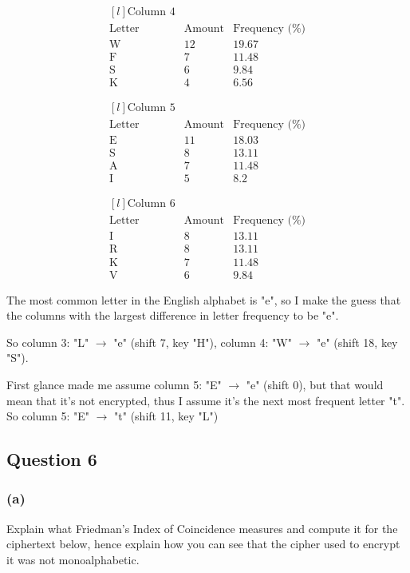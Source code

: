 \documentclass{article}
\begin{document}
	\[
	\begin{matrix*}[l]
	\text{Column 4} \\
	\text{Letter} & \text{Amount} & \text{Frequency (\%)} \\
	\text{W} & 12&19.67 \\
	\text{F} & 7&11.48 \\
	\text{S} & 6&9.84 \\
	\text{K} & 4&6.56
	\end{matrix*}
	\]
	
	\[
	\begin{matrix*}[l]
	\text{Column 5} \\
	\text{Letter} & \text{Amount} & \text{Frequency (\%)} \\
	\text{E} & 11&18.03 \\
	\text{S} & 8&13.11 \\
	\text{A} & 7&11.48 \\
	\text{I} & 5&8.2
	\end{matrix*}
	\]
	
	\[
	\begin{matrix*}[l]
	\text{Column 6} \\
	\text{Letter} & \text{Amount} & \text{Frequency (\%)} \\
	\text{I} & 8&13.11 \\
	\text{R} & 8&13.11 \\
	\text{K} & 7&11.48 \\
	\text{V} & 6&9.84
	\end{matrix*}
	\]
	
	The most common letter in the English alphabet is "e", so I make the guess that the columns with the largest difference in letter frequency to be "e".
	
	So column 3: "L" $\rightarrow$ "e" (shift 7, key "H"), column 4: "W" $\rightarrow$ "e" (shift 18, key "S"). 
	
	First glance made me assume column 5: "E" $\rightarrow$ "e" (shift 0), but that would mean that it's not encrypted, thus I assume it's the next most frequent letter "t". So column 5: "E" $\rightarrow$ "t" (shift 11, key "L")
	
	\subsection*{Question 6}
	\subsubsection*{(a)}
	Explain what Friedman’s Index of Coincidence measures and compute it for the
	ciphertext below, hence explain how you can see that the cipher used to encrypt it was not monoalphabetic.
	
\end{document}
